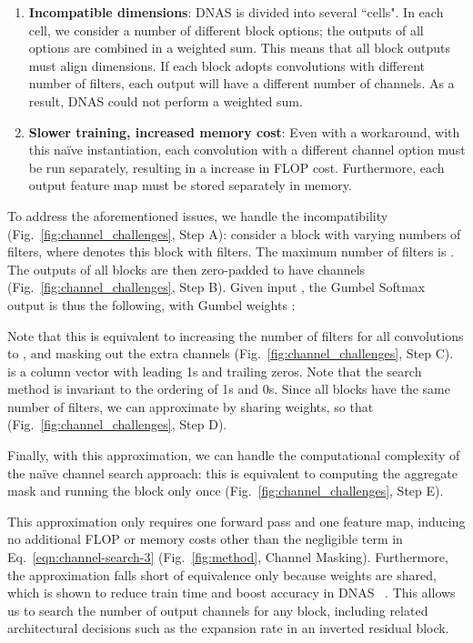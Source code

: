 \documentclass[10pt,twocolumn,letterpaper]{article}
\begin{document}
\begin{enumerate}
    \item \textbf{Incompatible dimensions}: DNAS is divided into several ``cells". In each cell, we consider a number of different block options; the outputs of all options are combined in a weighted sum. This means that all block outputs must align dimensions. If each block adopts convolutions with different number of filters, each output will have a different number of channels. As a result, DNAS could not perform a weighted sum.
    \item \textbf{Slower training, increased memory cost}: Even with a workaround, with this naïve instantiation, each convolution with a different channel option must be run separately, resulting in a  increase in FLOP cost. Furthermore, each output feature map must be stored separately in memory.\end{enumerate}

To address the aforementioned issues, we handle the incompatibility (Fig.~\ref{fig:channel_challenges}, Step A): consider a block  with varying numbers of filters, where  denotes this block with  filters. The maximum number of filters is . The outputs of all blocks are then zero-padded to have  channels (Fig.~\ref{fig:channel_challenges}, Step B). Given input , the Gumbel Softmax output is thus the following, with Gumbel weights :


Note that this is equivalent to increasing the number of filters for all convolutions to , and masking out the extra channels (Fig.~\ref{fig:channel_challenges}, Step C).  is a column vector with  leading 1s and  trailing zeros. Note that the search method is invariant to the ordering of 1s and 0s. Since all blocks  have the same number of filters, we can approximate by sharing weights, so that  (Fig.~\ref{fig:channel_challenges}, Step D).



Finally, with this approximation, we can handle the computational complexity of the naïve channel search approach: this is equivalent to computing the aggregate mask and running the block  only once (Fig.~\ref{fig:channel_challenges}, Step E).



This approximation only requires one forward pass and one feature map, inducing no additional FLOP or memory costs other than the negligible  term in Eq.~\ref{eqn:channel-search-3} (Fig.~\ref{fig:method}, Channel Masking). Furthermore, the approximation falls short of equivalence only because weights are shared, which is shown to reduce train time and boost accuracy in DNAS ~\cite{singlepathnas}. This allows us to search the number of output channels for any block, including related architectural decisions such as the expansion rate in an inverted residual block.
\end{document}
